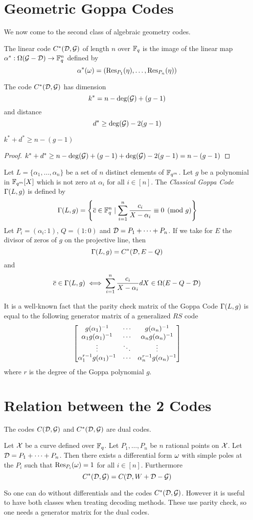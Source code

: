 \section{Geometric Goppa Codes}
We now come to the second class of algebraic geometry codes. 
\begin{definition}
	The linear code $C^*(\mathcal{D},\mathcal{G})$ of length $n$ over $\mathbb{F}_q$ is the image of the linear map $\alpha^*:\Omega(\mathcal{G}-\mathcal{D})\to \mathbb{F}_q^n$ defined by $$\alpha^*(\omega)=(\operatorname{Res}_{P_1}(\eta), \dots, \operatorname{Res}_{P_n}(\eta))$$
\end{definition}
\begin{theorem}
	The code $C^*(\mathcal{D},\mathcal{G})$ has dimension $$k^*=n-\deg(\mathcal{G})+(g-1)$$ and distance $$d^*\geq \deg(\mathcal{G})-2(g-1)$$
\end{theorem}
\begin{corollary}
	$k^*+d^*\geq n-(g-1)$
\end{corollary}
\begin{proof}
	$k^*+d^*\geq n-\deg(\mathcal{G})+(g-1)+\deg(\mathcal{G})-2(g-1)=n-(g-1)$
\end{proof}
\begin{example}
	Let $L=\{\alpha_1,\dots,\alpha_n\}$ be a set of $n$ distinct elements of $\mathbb{F}_{q^m}$. Let $g$ be a polynomial in $\mathbb{F}_{q^m}[X]$ which is not zero at $\alpha_i$ for all $i\in [n]$. The \textit{Classical Goppa Code} $\Gamma(L,g)$ is defined by $$\Gamma(L,g)=\left\{\overline{c}\in \mathbb{F}_q^n\mid \sum_{i=1}^n\frac{c_i}{X-\alpha_i}\equiv 0 \pmod{g}\right\}$$Let $P_i=(\alpha_i:1)$, $Q=(1:0)$ and $\mathcal{D}=P_1+\dots+P_n$. If we take for $E$ the divisor of zeros of $g$ on the projective line, then $$\Gamma(L,g)=C^*(\mathcal{D}, E-Q)$$ and $$\overline{c}\in \Gamma(L,g)\iff \sum_{i=1}^n\frac{c_i}{X-\alpha_i}dX\in \Omega(E-Q-\mathcal{D})$$
	
	It is a well-known fact that the parity check matrix of the Goppa Code $\Gamma(L,g)$ is equal to the following generator matrix of a generalized $RS$ code $$\left[\begin{matrix}g(\alpha_1)^{-1}  & \cdots & g(\alpha_n)^{-1}\\ \alpha_1g(\alpha_1)^{-1}  & \cdots & \alpha_ng(\alpha_n)^{-1}\\ \vdots & \ddots & \vdots \\ \alpha_1^{r-1}g(\alpha_1)^{-1}  & \cdots & \alpha_n^{r-1}g(\alpha_n)^{-1}\end{matrix}\right]$$where $r$ is the degree of the Goppa polynomial $g$.
\end{example}
\section{Relation between the 2 Codes}
\begin{theorem}
	The codes $C(\mathcal{D},\mathcal{G})$ and $C^*(\mathcal{D},\mathcal{G})$ are dual codes.
\end{theorem}
\begin{theorem}
	Let $\mathcal{X}$ be a curve defined over $\mathbb{F}_q$. Let $P_1,\dots, P_n$ be $n$ rational points on $\mathcal{X}$. Let $\mathcal{D}=P_1+\cdots+P_n$. Then there exists a differential form $\omega$ with simple poles at the $P_i$ such that $\operatorname{Res}_{P_i}(\omega)=1$ for all $i\in [n]$. Furthermore $$C^*(\mathcal{D},\mathcal{G})=C(\mathcal{D},W+\mathcal{D}-\mathcal{G})$$
\end{theorem}
So one can do without differentials and the codes $C^*(\mathcal{D},\mathcal{G})$. However it is useful to have both classes when treating decoding methods. These use parity check, so one needs a generator matrix for the dual codes.
